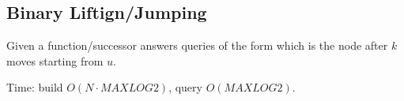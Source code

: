 \subsection{Binary Liftign/Jumping}

Given a function/successor answers queries of the form which is the node after $k$ moves starting from $u$.

Time: build $O(N \cdot MAXLOG2)$, query $O(MAXLOG2)$.
